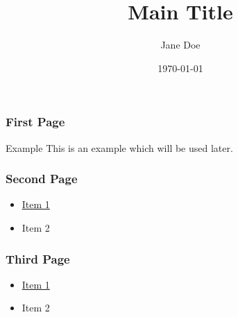 \documentclass[]{beamer}
\title{Main Title}
\author{Jane Doe}
\institute{University A}
\date{\today}
\begin{document}
    
    \begin{frame}
        \titlepage %
    \end{frame}
    
    \begin{frame}
        \frametitle{First Page}
        \begin{exampleblock}{Example}
            This is an example which will be used later.
        \end{exampleblock}
    \end{frame}
    
    \begin{frame}[label={important}]
        \frametitle{Second Page}
        \begin{itemize}
            \item \hyperlink{foo}{Item 1}
            \item Item 2 
        \end{itemize}
    \end{frame}
    
    \begin{frame}[label={foo}]
        \frametitle{Third Page}
        \begin{itemize}
        \item \hyperlink{important}{Item 1}
        \item Item 2
        \end{itemize}
    \end{frame}
    
\end{document}
